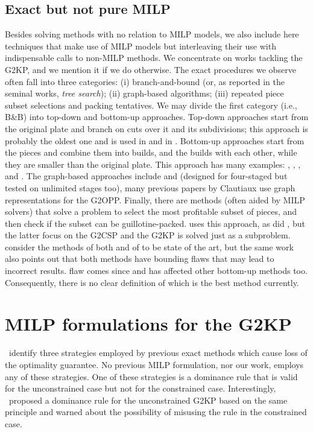 \documentclass[ppgc,prop-tese,english,formais,babel]{iiufrgs}
\begin{document}
\subsection{Exact but not pure MILP}

Besides solving methods with no relation to MILP models, we also include here techniques that make use of MILP models but interleaving their use with indispensable calls to non-MILP methods.
We concentrate on works tackling the G2KP, and we mention it if we do otherwise.
The exact procedures we observe often fall into three categories: (i) branch-and-bound (or, as reported in the seminal works, \emph{tree search}); (ii) graph-based algorithms; (iii) repeated piece subset selections and packing tentatives.
We may divide the first category (i.e., B\&B) into top-down and bottom-up approaches.
Top-down approaches start from the original plate and branch on cuts over it and its subdivisions; this approach is probably the oldest one and is used in \citet{cw:1977} and in \citet{nicos:1995:hadji_orthogonal}.
Bottom-up approaches start from the pieces and combine them into builds, and the builds with each other, while they are smaller than the original plate. This approach has many examples: \citet{bagchi:1993}, \citet{hifi:1997}, \citet{cung:2000}, and \citet{yoon:2013}.
The graph-based approaches include \citet{morabito:1996} and \citet{clautiaux:2018} (designed for four-staged but tested on unlimited stages too), many previous papers by Clautiaux use graph representations for the G2OPP.
Finally, there are methods (often aided by MILP solvers) that solve a problem to select the most profitable subset of pieces, and then check if the subset can be guillotine-packed.
\citet{dolatabadi:2012} uses this approach, as did \citet{pisinger:2007}, but the latter focus on the G2CSP and the G2KP is solved just as a subproblem.
\citet{russo:2020} consider the methods of both \citet{dolatabadi:2012} and of \citet{yoon:2013} to be state of the art, but the same work also points out that both methods have bounding flaws that may lead to incorrect results.
\citet{yoon:2013} flaw comes since \citet{cung:2000} and has affected other bottom-up methods too.
Consequently, there is no clear definition of which is the best method currently.

\section{MILP formulations for the G2KP}

\citet{russo:2020}~identify three strategies employed by previous exact methods which cause loss of the optimality guarantee.
No previous MILP formulation, nor our work, employs any of these strategies.
One of these strategies is a dominance rule that is valid for the unconstrained case but not for the constrained case.
Interestingly, \citet{herz:1972}~proposed a dominance rule for the unconstrained G2KP based on the same principle and warned about the possibility of misusing the rule in the constrained case.
\end{document}
